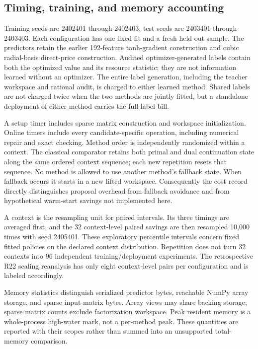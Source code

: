\documentclass[11pt,letterpaper]{article}
\theoremstyle{definition}
\newcommand{\1}{\mathbf 1}
\begin{document}
\subsection{Timing, training, and memory accounting}
Training seeds are 2402401 through 2402403; test seeds are 2403401 through
2403403. Each configuration has one fixed fit and a fresh held-out sample.
The predictors retain the earlier 192-feature tanh-gradient construction and
cubic radial-basis direct-price construction. Audited optimizer-generated labels contain
both the optimized value and its resource statistic; they are not information
learned without an optimizer. The entire label generation, including the
teacher workspace and rational audit, is charged to either learned method.
Shared labels are not charged twice when the two methods are jointly fitted,
but a standalone deployment of either method carries the full label bill.

A setup timer includes sparse matrix construction and workspace initialization.
Online timers include every candidate-specific operation, including numerical
repair and exact checking. Method order is independently randomized within a
context. The classical comparator retains both primal and dual continuation
state along the same ordered context sequence; each new repetition resets that
sequence. No method is allowed to use another method's fallback state. When
fallback occurs it starts in a new lifted workspace. Consequently the cost
record directly distinguishes proposal overhead from fallback avoidance and
from hypothetical warm-start savings not implemented here.

A context is the resampling unit for paired intervals. Its three timings are
averaged first, and the 32 context-level paired savings are then resampled
10,000 times with seed 2405401. These exploratory percentile intervals concern
fixed fitted policies on the declared context distribution. Repetition does
not turn 32 contexts into 96 independent training/deployment experiments.
The retrospective R22 scaling reanalysis has only eight context-level pairs
per configuration and is labeled accordingly.

Memory statistics distinguish serialized predictor bytes, reachable NumPy
array storage, and sparse input-matrix bytes. Array views may share backing
storage; sparse matrix counts exclude factorization workspace. Peak resident
memory is a whole-process high-water mark, not a per-method peak. These
quantities are reported with their scopes rather than summed into an
unsupported total-memory comparison.
\end{document}
